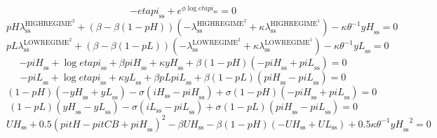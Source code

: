 \begin{equation}
-{e\!t\!a\!p\!i}_\mathrm{ss} + e^{{\phi} {\log{{e\!t\!a\!p\!i}_\mathrm{ss}}}} = 0
\end{equation}
\begin{equation}
{{p\!H}} {\lambda^{\mathrm{HIGHREGIME}^{\mathrm{2}}}_\mathrm{ss}} + \left(\beta - {\beta} \left(1 - {p\!H}\right)\right) \left(-\lambda^{\mathrm{HIGHREGIME}^{\mathrm{2}}}_\mathrm{ss} + {\kappa} {\lambda^{\mathrm{HIGHREGIME}^{\mathrm{1}}}_\mathrm{ss}}\right) - {\kappa} {\theta}^{-1} {{y\!H}_\mathrm{ss}} = 0
\end{equation}
\begin{equation}
{{p\!L}} {\lambda^{\mathrm{LOWREGIME}^{\mathrm{2}}}_\mathrm{ss}} + \left(\beta - {\beta} \left(1 - {p\!L}\right)\right) \left(-\lambda^{\mathrm{LOWREGIME}^{\mathrm{2}}}_\mathrm{ss} + {\kappa} {\lambda^{\mathrm{LOWREGIME}^{\mathrm{1}}}_\mathrm{ss}}\right) - {\kappa} {\theta}^{-1} {{y\!L}_\mathrm{ss}} = 0
\end{equation}
\begin{equation}
-{p\!i\!H}_\mathrm{ss} + \log{{e\!t\!a\!p\!i}_\mathrm{ss}} + {\beta} {{p\!i\!H}_\mathrm{ss}} + {\kappa} {{y\!H}_\mathrm{ss}} + {\beta} \left(1 - {p\!H}\right) \left(-{p\!i\!H}_\mathrm{ss} + {p\!i\!L}_\mathrm{ss}\right) = 0
\end{equation}
\begin{equation}
-{p\!i\!L}_\mathrm{ss} + \log{{e\!t\!a\!p\!i}_\mathrm{ss}} + {\kappa} {{y\!L}_\mathrm{ss}} + {\beta} {{p\!L}} {{p\!i\!L}_\mathrm{ss}} + {\beta} \left(1 - {p\!L}\right) \left({p\!i\!H}_\mathrm{ss} - {p\!i\!L}_\mathrm{ss}\right) = 0
\end{equation}
\begin{equation}
\left(1 - {p\!H}\right) \left(-{y\!H}_\mathrm{ss} + {y\!L}_\mathrm{ss}\right) - {\sigma} \left({i\!H}_\mathrm{ss} - {p\!i\!H}_\mathrm{ss}\right) + {\sigma} \left(1 - {p\!H}\right) \left(-{p\!i\!H}_\mathrm{ss} + {p\!i\!L}_\mathrm{ss}\right) = 0
\end{equation}
\begin{equation}
\left(1 - {p\!L}\right) \left({y\!H}_\mathrm{ss} - {y\!L}_\mathrm{ss}\right) - {\sigma} \left({i\!L}_\mathrm{ss} - {p\!i\!L}_\mathrm{ss}\right) + {\sigma} \left(1 - {p\!L}\right) \left({p\!i\!H}_\mathrm{ss} - {p\!i\!L}_\mathrm{ss}\right) = 0
\end{equation}
\begin{equation}
{U\!H}_\mathrm{ss} + 0.5\left({p\!i\!t\!H} - {p\!i\!t\!C\!B} + {p\!i\!H}_\mathrm{ss}\right)^{2} - {\beta} {{U\!H}_\mathrm{ss}} - {\beta} \left(1 - {p\!H}\right) \left(-{U\!H}_\mathrm{ss} + {U\!L}_\mathrm{ss}\right) + 0.5{\kappa} {\theta}^{-1} {{y\!H}_\mathrm{ss}}^{2} = 0
\end{equation}
